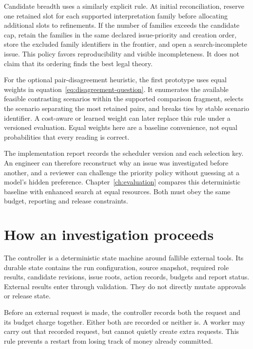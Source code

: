 Candidate breadth uses a similarly explicit rule. At initial reconciliation,
reserve one retained slot for each supported interpretation family before
allocating additional slots to refinements. If the number of families exceeds the
candidate cap, retain the families in the same declared issue-priority and
creation order, store the excluded family identifiers in the frontier, and open
a search-incomplete issue. This policy favors reproducibility and visible
incompleteness. It does not claim that its ordering finds the best legal theory.

For the optional pair-disagreement heuristic, the first prototype uses equal
weights in equation~\eqref{eq:disagreement-question}. It enumerates the available
feasible contrasting scenarios within the supported comparison fragment, selects
the scenario separating the most retained pairs, and breaks ties by stable
scenario identifier. A cost-aware or learned weight can later replace this rule
under a versioned evaluation. Equal weights here are a baseline convenience,
not equal probabilities that every reading is correct.

The implementation report records the scheduler version and each selection key.
An engineer can therefore reconstruct why an issue was investigated before
another, and a reviewer can challenge the priority policy without guessing at a
model's hidden preference. Chapter~\ref{ch:evaluation} compares this deterministic
baseline with enhanced search at equal resources. Both must obey the same budget,
reporting and release constraints.

\section{How an investigation proceeds}
\label{merge:M06:15}


The controller is a deterministic state machine around fallible external tools.
Its durable state contains the run configuration, source snapshot, required role
results, candidate revisions, issue roots, action records, budgets and report
status. External results enter through validation. They do not directly mutate
approvals or release state.

Before an external request is made, the controller records both the request and
its budget charge together. Either both are recorded or neither is. A worker
may carry out that recorded request, but cannot quietly create extra requests.
This rule prevents a restart from losing track of money already committed.

